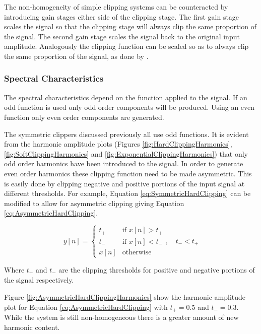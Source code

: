 			The non-homogeneity of simple clipping systems can be counteracted by introducing gain stages
			either side of the clipping stage. The first gain stage scales the signal so that the clipping
			stage will always clip the same proportion of the signal. The second gain stage scales the signal
			back to the original input amplitude. Analogously the clipping function can be scaled so as to
			always clip the same proportion of the signal, as done by \citet{deman2014adaptive}.

		\subsubsection*{Spectral Characteristics}
			The spectral characteristics depend on the function applied to the signal. If an odd function is
			used only odd order components will be produced. Using an even function only even order components
			are generated. 

			The symmetric clippers discussed previously all use odd functions. It is evident from the harmonic
			amplitude plots (Figures \ref{fig:HardClippingHarmonics}, \ref{fig:SoftClippingHarmonics} and
			\ref{fig:ExponentialClippingHarmonics}) that only odd order harmonics have been introduced to the
			signal. In order to generate even order harmonics these clipping function need to be made
			asymmetric. This is easily done by clipping negative and positive portions of the input signal at
			different thresholds. For example, Equation \ref{eq:SymmetricHardClipping} can be modified to allow
			for asymmetric clipping giving Equation \ref{eq:AsymmetricHardClipping}.
			
			\begin{equation}
				y[n] = \begin{cases}
					t_{+} & \text{if $x[n] > t_{+}$} \\
					t_{-} & \text{if $x[n] < t_{-}$} \\
					x[n] & \text{otherwise}
				\end{cases}, \quad t_{-} < t_{+}
				\label{eq:AsymmetricHardClipping}
			\end{equation}

			Where $t_{+}$ and $t_{-}$ are the clipping thresholds for positive and negative portions of the
			signal respectively.	

			Figure \ref{fig:AsymmetricHardClippingHarmonics} show the harmonic amplitude plot for Equation
			\ref{eq:AsymmetricHardClipping} with $t_{+} = 0.5$ and $t_{-} = 0.3$. While the system is still
			non-homogeneous there is a greater amount of new harmonic content.


